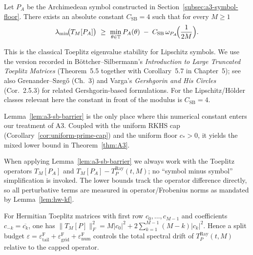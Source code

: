 \begin{lemma}\label{lem:a3-sb-barrier}
Let $P_A$ be the Archimedean symbol constructed in Section~\ref{subsec:a3-symbol-floor}.
There exists an absolute constant $C_{\mathrm{SB}}=4$ such that for every $M\ge1$
\[
  \lambda_{\min}\!\bigl(T_M[P_A]\bigr)\ \ge\ \min_{\theta\in\TT}P_A(\theta)\;-\;C_{\mathrm{SB}}\,\omega_{P_A}\!\Bigl(\frac{1}{2M}\Bigr).
\]
\end{lemma}

\begin{remark}\label{rem:a3-sb-sources}
This is the classical Toeplitz eigenvalue stability for Lipschitz symbols.  We use the version recorded in
B\"ottcher--Silbermann's \textit{Introduction to Large Truncated Toeplitz Matrices} (Theorem~5.5 together with
Corollary~5.7 in Chapter~5); see also Grenander--Szeg\H{o} (Ch.~3) and Varga's \textit{Gershgorin and His Circles} (Cor.~2.5.3) for related Gershgorin-based formulations.
For the Lipschitz/H\"older classes relevant here the constant in front of the modulus is $C_{\mathrm{SB}}=4$.

Lemma~\ref{lem:a3-sb-barrier} is the only place where this numerical constant enters our treatment of A3.
Coupled with the uniform RKHS cap (Corollary~\ref{cor:uniform-prime-cap}) and the uniform floor $c_*>0$,
it yields the mixed lower bound in Theorem~\ref{thm:A3}.
\end{remark}

\begin{remark}\label{rem:a3-operator-diff}
When applying Lemma~\ref{lem:a3-sb-barrier} we always work with
the Toeplitz operators $T_M[P_A]$ and $T_M[P_A]-T_P^{\mathrm{Ray}}(t,M)$; no ``symbol minus symbol'' simplification
is invoked.  The lower bounds track the operator difference directly, so all perturbative terms
are measured in operator/Frobenius norms as mandated by Lemma~\ref{lem:hw-kf}.
\end{remark}

\begin{remark}
For Hermitian Toeplitz matrices with first row $c_0,\dots,c_{M-1}$ and coefficients $c_{-k}=\overline{c_k}$, one has
\(\|T_M[P]\|_F^2 = M|c_0|^2 + 2\sum_{k=1}^{M-1} (M-k)|c_k|^2\).
Hence a split budget $\varepsilon = \varepsilon^{\mathrm{F}}_{\text{tail}} + \varepsilon^{\mathrm{F}}_{\text{grid}} + \varepsilon^{\mathrm{F}}_{\text{num}}$ controls the total spectral drift of $T_P^{\mathrm{Ray}}(t,M)$ relative to the capped operator.
\end{remark}
